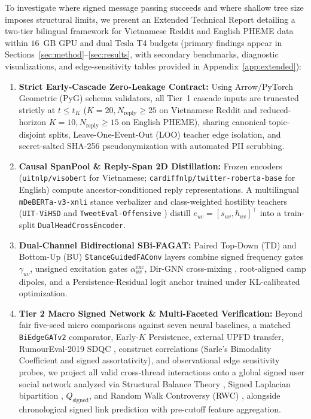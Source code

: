 \documentclass[conference]{IEEEtran}
\begin{document}
To investigate where signed message passing succeeds and where shallow tree size imposes structural limits, we present an Extended Technical Report detailing a two-tier bilingual framework for Vietnamese Reddit and English PHEME data within $16$~GB GPU and dual Tesla T4 budgets (primary findings appear in Sections~\ref{sec:method}--\ref{sec:results}, with secondary benchmarks, diagnostic visualizations, and edge-sensitivity tables provided in Appendix~\ref{app:extended}):
\begin{enumerate}
    \item \textbf{Strict Early-Cascade Zero-Leakage Contract:} Using Arrow/PyTorch Geometric (PyG) schema validators, all Tier~1 cascade inputs are truncated strictly at $t \le t_K$ ($K=20, N_{\text{reply}} \ge 25$ on Vietnamese Reddit and reduced-horizon $K=10, N_{\text{reply}} \ge 15$ on English PHEME), sharing canonical topic-disjoint splits, Leave-One-Event-Out (LOO) teacher edge isolation, and secret-salted SHA-256 pseudonymization with automated PII scrubbing.
    \item \textbf{Causal SpanPool \& Reply-Span 2D Distillation:} Frozen encoders (\texttt{uitnlp/visobert} \cite{nguyen2023visobert} for Vietnamese; \texttt{cardiffnlp/twitter-roberta-base} \cite{barbieri2020tweeteval} for English) compute ancestor-conditioned reply representations. A multilingual \texttt{mDeBERTa-v3-xnli} stance verbalizer \cite{laurer2024less,he2023debertav3} and class-weighted hostility teachers (\texttt{UIT-ViHSD} \cite{luu2021vihsd} and \texttt{TweetEval-Offensive} \cite{barbieri2020tweeteval}) distill $e_{uv} = [s_{uv}, h_{uv}]^\top$ into a train-split \texttt{DualHeadCrossEncoder}.
    \item \textbf{Dual-Channel Bidirectional SBi-FAGAT:} Paired Top-Down (TD) and Bottom-Up (BU) \texttt{StanceGuidedFAConv} layers combine signed frequency gates $\gamma_{uv}$, unsigned excitation gates $\alpha_{uv}^{\text{exc}}$, Dir-GNN cross-mixing \cite{rossi2023edge}, root-aligned camp dipoles, and a Persistence-Residual logit anchor trained under KL-calibrated optimization.
    \item \textbf{Tier 2 Macro Signed Network \& Multi-Faceted Verification:} Beyond fair five-seed micro comparisons against seven neural baselines, a matched \texttt{BiEdgeGATv2} comparator, Early-$K$ Persistence, external UPFD \cite{dou2021upfd} transfer, RumourEval-2019 SDQC \cite{gorrell2019semeval}, construct correlations (Sarle's Bimodality Coefficient \cite{pfister2013good} and signed assortativity), and observational edge sensitivity probes, we project all valid cross-thread interactions onto a global signed user social network analyzed via Structural Balance Theory \cite{cartwright1956structural}, Signed Laplacian bipartition \cite{kunegis2010spectral}, $Q_{\text{signed}}$, and Random Walk Controversy (RWC) \cite{garimella2018quantifying}, alongside chronological signed link prediction with pre-cutoff feature aggregation.
\end{enumerate}
\end{document}
